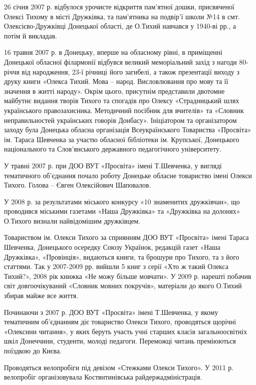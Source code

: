 26 січня 2007 р. відбулося урочисте відкриття пам'ятної дошки, присвяченої
Олексі Тихому в місті Дружківка, та пам'ятника на подвір'ї школи №14 в смт.
Олексієво-Дружківці Донецької області, де О.Тихий навчався у 1940-ві рр., а
потім й викладав. 

16 травня 2007 р. в Донецьку, вперше на обласному рівні, в приміщенні Донецької
обласної філармонії відбувся великий меморіальний захід з нагоди 80-річчя від
народження, 23-ї річниці його загибелі, а також презентації виходу з друку
книги «Олекса Тихий. Мова – народ. Висловлювання про мову та її значення в
житті народу». Окрім цього, присутнім представили двотомне майбутнє видання
творів Тихого та спогадів про Олексу «Страдницький шлях українського
правозахисника. Методичний посібник для вчителів» та «Словник неправильностей
українських говорів Донбасу». Ініціатором та організатором заходу була Донецька
обласна організація Всеукраїнського Товариства «Просвіта» ім. Тараса Шевченка
за участю обласної бібліотеки ім. Крупської, Донецького національного та
Слов'янського державного педагогічного університету. 

У травні 2007 р. при ДОО ВУТ «Просвіта» імені Т.Шевченка, у вигляді тематичного
об'єднання почало роботу Донецьке обласне товариство імені Олекси Тихого.
Голова – Євген Олексійович Шаповалов.

У 2008 р. за результатами міського конкурсу «10 знаменитих дружківчан», що
проводився міськими газетами «Наша Дружківка» та «Дружківка на долонях»
О.Тихого визнали найвідомішим дружківцем.

Товариством ім. Олекси Тихого за сприянням ДОО ВУТ «Просвіта» імені Тараса
Шевченка, Донецького осередку Союзу Українок, редакцій газет «Наша Дружківка»,
«Провінція», видаються книги, та брошури про Тихого, та з його статтями. Так у
2007-2009 рр. вийшли 5 книг з серії «Хто ж такий Олекса Тихий?», 2008 рік
книжка «Не можу більше мовчати». У 2009 р. нарешті побачив світ довгоочікуваний
«Словник мовних покручів», матеріали до якого О.Тихий збирав майже все життя.

Починаючи з 2007 р. ДОО ВУТ «Просвіта» імені Т.Шевченка, у якому тематичним
об'єднанням діє товариство Олекси Тихого, проводяться щорічні «Олексини
читання», у яких беруть участь учні старших класів загальноосвітніх шкіл
Донеччини, студенти, молоді педагоги. Переможці читань преміюються поїздкою до
Києва.

Проводяться велопробіги під девізом «Стежками Олекси Тихого». У 2011 р.
велопробіг організовувала Костянтинівська райдержадміністрація.

